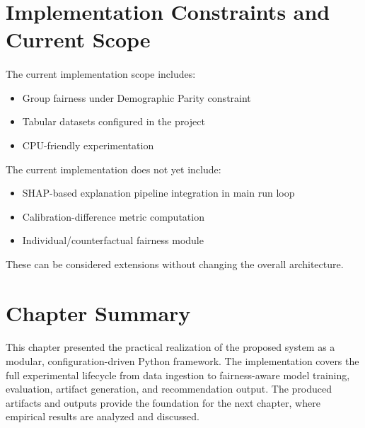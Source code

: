 \section{Implementation Constraints and Current Scope}
\paragraph{}

The current implementation scope includes:
\begin{itemize}
    \item Group fairness under Demographic Parity constraint
    \item Tabular datasets configured in the project
    \item CPU-friendly experimentation
\end{itemize}

The current implementation does not yet include:
\begin{itemize}
    \item SHAP-based explanation pipeline integration in main run loop
    \item Calibration-difference metric computation
    \item Individual/counterfactual fairness module
\end{itemize}

These can be considered extensions without changing the overall architecture.

\section{Chapter Summary}
\paragraph{}

This chapter presented the practical realization of the proposed system as a modular, configuration-driven Python framework. The implementation covers the full experimental lifecycle from data ingestion to fairness-aware model training, evaluation, artifact generation, and recommendation output. The produced artifacts and outputs provide the foundation for the next chapter, where empirical results are analyzed and discussed.